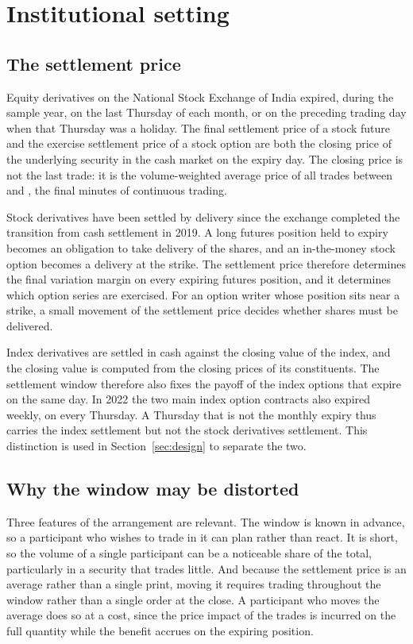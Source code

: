 \section{Institutional setting}\label{sec:background}

\subsection{The settlement price}

Equity derivatives on the National Stock Exchange of India expired, during the sample year,
on the last Thursday of each month, or on the preceding trading day when that Thursday was a
holiday. The final settlement price of a stock future and the exercise settlement price of a
stock option are both the closing price of the underlying security in the cash market on the
expiry day. The closing price is not the last trade: it is the volume-weighted average price
of all trades between \DesignWindowStart{} and \DesignWindowEnd{}, the final
\DesignWindowMinutes{} minutes of continuous trading.

Stock derivatives have been settled by delivery since the exchange completed the transition
from cash settlement in 2019. A long futures position held to expiry becomes an obligation to
take delivery of the shares, and an in-the-money stock option becomes a delivery at the
strike. The settlement price therefore determines the final variation margin on every
expiring futures position, and it determines which option series are exercised. For an option
writer whose position sits near a strike, a small movement of the settlement price decides
whether shares must be delivered.

Index derivatives are settled in cash against the closing value of the index, and the
closing value is computed from the closing prices of its constituents. The settlement window
therefore also fixes the payoff of the index options that expire on the same day. In 2022 the
two main index option contracts also expired weekly, on every Thursday. A Thursday that is
not the monthly expiry thus carries the index settlement but not the stock derivatives
settlement. This distinction is used in Section~\ref{sec:design} to separate the two.

\subsection{Why the window may be distorted}

Three features of the arrangement are relevant. The window is known in advance, so a
participant who wishes to trade in it can plan rather than react. It is short, so the volume
of a single participant can be a noticeable share of the total, particularly in a security
that trades little. And because the settlement price is an average rather than a single
print, moving it requires trading throughout the window rather than a single order at the
close. A participant who moves the average does so at a cost, since the price impact of the
trades is incurred on the full quantity while the benefit accrues on the expiring position.

